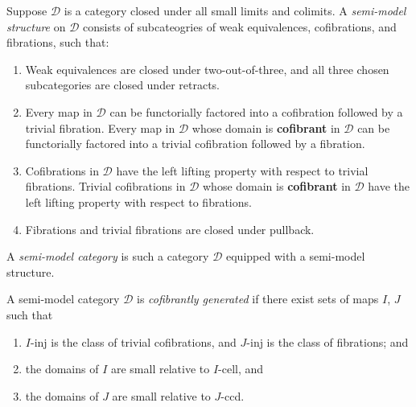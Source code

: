 \documentclass[a4paper,10pt
,draft
]{article}%
\renewcommand{\1}{\eta}%
\begin{document}
\begin{definition}
      Suppose $\mathcal D$ is a category closed under all small limits and colimits.
      A \textit{semi-model structure} on $\mathcal D$ consists of
      subcateogries of weak equivalences, cofibrations, and fibrations, such that:
      \begin{enumerate}[label = (\roman*)]
      \item Weak equivalences are closed under two-out-of-three, and all three chosen subcategories are closed under retracts.
      \item Every map in $\mathcal D$ can be functorially factored into a cofibration followed by a trivial fibration.
            Every map in $\mathcal D$ whose domain is \textbf{cofibrant} in $\mathcal D$ can be functorially factored into a trivial cofibration followed by a fibration.
      \item Cofibrations in $\mathcal D$ have the left lifting property with respect to trivial fibrations.
            Trivial cofibrations in $\mathcal D$ whose domain is \textbf{cofibrant} in $\mathcal D$ have the left lifting property with respect to fibrations.
      \item Fibrations and trivial fibrations are closed under pullback.
      \end{enumerate}

      A \textit{semi-model category} is such a category $\mathcal D$ equipped with a semi-model structure.

      A semi-model category $\mathcal D$ is \textit{cofibrantly generated} if there exist sets of maps $ I$, $ J$ such that
      \begin{enumerate}[label = (\roman*)]
      \item $ I$-inj is the class of trivial cofibrations, and $ J$-inj is the class of fibrations; and
      \item the domains of $ I$ are small relative to $ I$-cell, and
      \item the domains of $ J$ are small relative to $ J$-ccd.
      \end{enumerate}
\end{definition}
\end{document}
